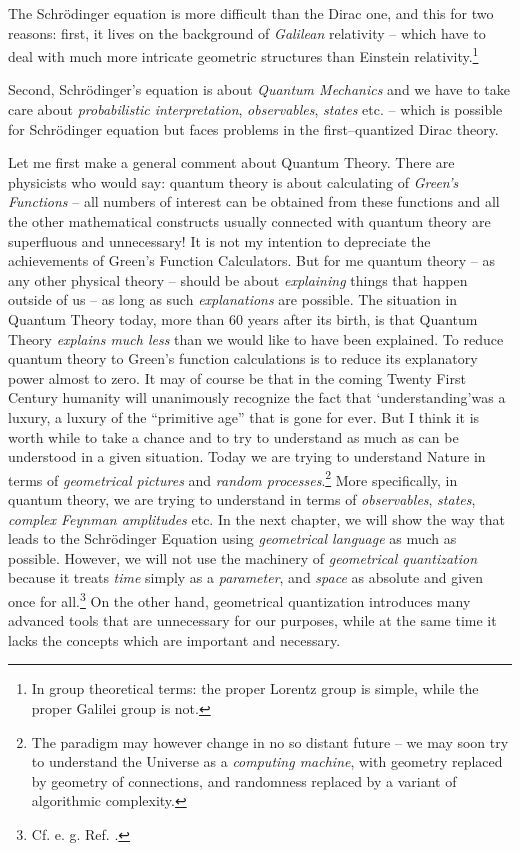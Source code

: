 \documentclass[12pt]{article}
\begin{document}
The Schr\"odinger equation is more
difficult than the Dirac one,  and this for two reasons: 
first,  it lives on the
background of {\em Galilean} relativity -- which have to deal with much more
intricate geometric structures than Einstein relativity.\footnote{
In group theoretical terms:  the proper Lorentz group is simple, 
while the proper Galilei group is not. } 

Second, 
Schr\"odinger's equation is about {\em Quantum Mechanics} and we have to take
care about {\em probabilistic interpretation},  {\em observables},  {\em states
} etc.  -- which is possible for Schr\"odinger equation but faces
problems in the first--quantized Dirac theory.

Let me first make a general comment about Quantum Theory.  There are
physicists who would say:  quantum theory is about calculating of {\em 
Green's Functions} -- all numbers of interest can be obtained from these
functions and all the other mathematical constructs usually connected with 
quantum theory are
superfluous and unnecessary! It is not my intention to depreciate the 
achievements of Green's
Function Calculators.  But for me quantum theory -- 
as any other physical theory -- should be
about  {\em explaining} things that happen outside of us -- as long as such {\em 
explanations} are possible.  The situation in Quantum Theory today,  more than
60 years after its birth,  is that Quantum Theory {\em explains much less}
than we would like to have been explained.
To reduce quantum theory to Green's
function calculations  is to reduce its explanatory power almost
to  zero.  
 It may of course be that in the coming 
  Twenty First  Century humanity will unanimously
recognize the fact that `understanding'\thinspace was a luxury,  a luxury of
the ``primitive age'' that is gone for ever.  But I think it is worth
while to take a chance and to try to  understand as much as can be
understood in a given situation.  Today we are trying to understand Nature
in terms of {\em geometrical pictures} and
{\em random processes\/}.\footnote{The paradigm  may however change in no so
distant  future -- we may soon try to understand the Universe as a
{\em computing machine},  with geometry replaced by geometry of
connections,  and randomness replaced by a variant of algorithmic
complexity. } More specifically,  in quantum theory,  we are trying to
understand in terms of {\em observables},  {\em states}, 
{\em complex Feynman amplitudes}
etc.  In the next chapter,  we will show the way that leads to the
 Schr\"odinger Equation using
{\em geometrical language} as much as possible.  However,  we will not use the
machinery of {\em geometrical quantization} because it treats {\em time}
simply as a {\em parameter},  and {\em space} as absolute and
given once for all.\footnote{Cf.  e. g.  Ref.  \cite[Ch. 9]{snia}. }
On the other hand,  geometrical quantization introduces many
advanced tools
that are unnecessary
for our purposes,  while at the same time it lacks the concepts which are
important and necessary.
\end{document}

